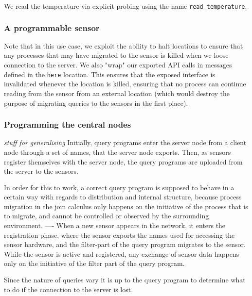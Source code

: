 We read the temperature via explicit probing using the name \verb+read_temperature+.

\subsubsection*{A programmable sensor}

Note that in this use case, we exploit the ability to halt
locations to ensure that any processes that may have migrated to
the sensor is killed when we loose connection to the server. We
also "wrap" our exported API calls in messages defined in the
\verb!here! location. This ensures that the exposed interface is
invalidated whenever the location is killed, ensuring that no
process can continue reading from the sensor from an external
location (which would destroy the purpose of migrating queries to
the sensors in the first place).

\subsubsection*{Programming the central nodes}

\emph{stuff for generalising}
Initially, query programs enter the server node from a client node
through a set of names, that the server node exports.
Then, as sensors register themselves with the server node, the query
programs are uploaded from the server to the sensors.

In order for this to work, a correct query program is supposed to
behave in a certain way with regards to distribution and internal
structure, because process migration in the join calculus only happens on
the initiative of the process that is to migrate, and cannot be controlled
or observed by the surrounding environment.
----
When a new sensor appears in the network, it enters the registration
phase, where the sensor exports the names used for accessing the
sensor hardware, and the filter-part of the query program migrates to
the sensor.
While the sensor is active and registered, any exchange of sensor data
happens only on the initiative of the filter part of the query
program.

Since the nature of queries vary it is up to the query program to determine
what to do if the connection to the server is lost.

